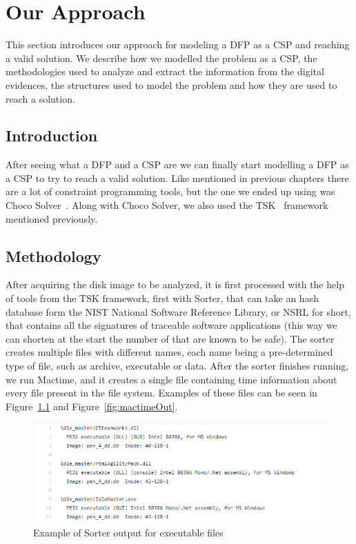 \chapter{Our Approach}

This section introduces our approach for modeling a \acf{DFP} as a \acf{CSP} and reaching a valid solution. We describe how we modelled the problem as a \ac{CSP}, the methodologies used to analyze and extract the information from the digital evidences, the structures used to model the problem and how they are used to reach a solution.

\section{Introduction}

After seeing what a \ac{DFP} and a \ac{CSP} are we can finally start modelling a \ac{DFP} as a \ac{CSP} to try to reach a valid solution. Like mentioned in previous chapters there are a lot of constraint programming tools, but the one we ended up using was Choco Solver~\cite{chocoSolver}. Along with Choco Solver, we also used the \ac{TSK}~\cite{tsk} framework mentioned previously.

\section{Methodology}

After acquiring the disk image to be analyzed, it is first processed with the help of tools from the \ac{TSK} framework, first with Sorter, that can take an hash database form the NIST National Software Reference Library, or NSRL for short, that contains all the signatures of traceable software applications (this way we can shorten at the start the number of \INODES that are known to be safe). The sorter creates multiple files with different names, each name being a pre-determined type of file, such as archive, executable or data. After the sorter finishes running, we run Mactime, and it creates a single file containing time information about every file present in the file system. Examples of these files can be seen in Figure~\ref{fig:sorterOut} and Figure~\ref{fig:mactimeOut}. 

\begin{figure}[ht]
    \centering
    \includegraphics[width=120mm]{sorter_out.png}
    \caption{Example of Sorter output for executable files}
    \label{fig:sorterOut}
\end{figure}

